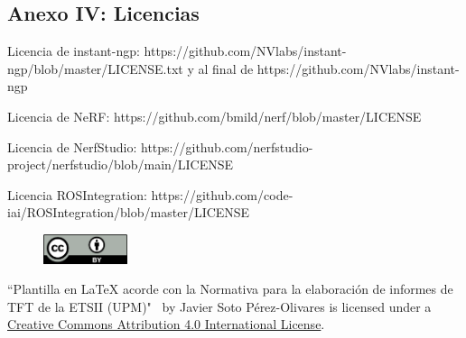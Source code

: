 \documentclass[a4paper, 12pt, spanish, twoside]{article}
\begin{document}
\printglossary[title=Glosario, toctitle=Glosario]

\printglossary[type=\acronymtype, title=Acrónimos, toctitle=Acrónimos]


\clearpage




\newpage
\subsection{Anexo IV: Licencias} \label{sec:anexo4}

Licencia de instant-ngp: https://github.com/NVlabs/instant-ngp/blob/master/LICENSE.txt y al final de https://github.com/NVlabs/instant-ngp

Licencia de NeRF: https://github.com/bmild/nerf/blob/master/LICENSE

Licencia de NerfStudio: https://github.com/nerfstudio-project/nerfstudio/blob/main/LICENSE

Licencia ROSIntegration: https://github.com/code-iai/ROSIntegration/blob/master/LICENSE

\begin{figure}
    \vspace{-\baselineskip}
    \href{http://creativecommons.org/licenses/by/4.0/}{\includegraphics[width=0.22\textwidth]{cc-by.png}}
\end{figure} 

\vspace*{\fill}
``Plantilla en LaTeX acorde con la Normativa para la elaboración de informes de TFT de la ETSII (UPM)" \ by Javier Soto Pérez-Olivares is licensed under a \href{http://creativecommons.org/licenses/by/4.0/}{Creative Commons Attribution 4.0 International License}.

\clearpage



\end{document}
